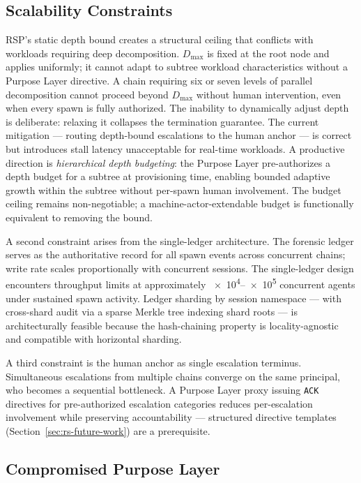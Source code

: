 \subsection{Scalability Constraints}
\label{sec:rs-scalability}

RSP's static depth bound creates a structural ceiling that conflicts with workloads requiring deep decomposition. $D_{\max}$ is fixed at the root node and applies uniformly; it cannot adapt to subtree workload characteristics without a Purpose Layer directive. A chain requiring six or seven levels of parallel decomposition cannot proceed beyond $D_{\max}$ without human intervention, even when every spawn is fully authorized. The inability to dynamically adjust depth is deliberate: relaxing it collapses the termination guarantee. The current mitigation — routing depth-bound escalations to the human anchor — is correct but introduces stall latency unacceptable for real-time workloads. A productive direction is \emph{hierarchical depth budgeting}: the Purpose Layer pre-authorizes a depth budget for a subtree at provisioning time, enabling bounded adaptive growth within the subtree without per-spawn human involvement. The budget ceiling remains non-negotiable; a machine-actor-extendable budget is functionally equivalent to removing the bound.

A second constraint arises from the single-ledger architecture. The forensic ledger serves as the authoritative record for all spawn events across concurrent chains; write rate scales proportionally with concurrent sessions. The single-ledger design encounters throughput limits at approximately \numrange{e4}{e5} concurrent agents under sustained spawn activity. Ledger sharding by session namespace — with cross-shard audit via a sparse Merkle tree indexing shard roots — is architecturally feasible because the hash-chaining property is locality-agnostic and compatible with horizontal sharding.

A third constraint is the human anchor as single escalation terminus. Simultaneous escalations from multiple chains converge on the same principal, who becomes a sequential bottleneck. A Purpose Layer proxy issuing \texttt{ACK} directives for pre-authorized escalation categories reduces per-escalation involvement while preserving accountability — structured directive templates (Section~\ref{sec:rs-future-work}) are a prerequisite.

\subsection{Compromised Purpose Layer}
\label{sec:rs-purpose-compromise}

